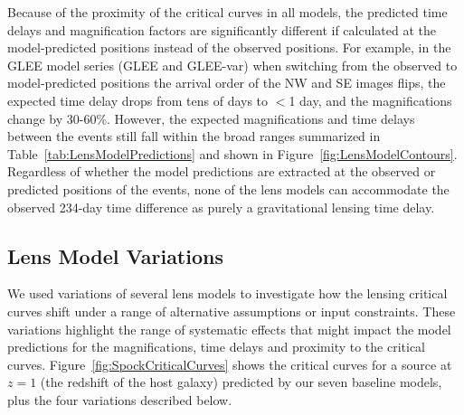
Because of the proximity of the critical curves in all models, the
predicted time delays and magnification factors are significantly
different if calculated at the model-predicted positions instead of
the observed positions.  For example, in the GLEE model series (GLEE
and GLEE-var) when switching from the observed to model-predicted
positions the arrival order of the NW and SE images flips, the
expected time delay drops from tens of days to $<$1 day, and the
magnifications change by 30-60\%.  However, the expected
magnifications and time delays between the events still fall within
the broad ranges summarized in Table~\ref{tab:LensModelPredictions}
and shown in Figure~\ref{fig:LensModelContours}.  Regardless of
whether the model predictions are extracted at the observed or
predicted positions of the \spock events, none of the lens models can
accommodate the observed 234-day time difference as purely a
gravitational lensing time delay.



\subsection{Lens Model Variations}\label{sec:LensModelVariations}

We used variations of several lens models to investigate how the
lensing critical curves shift under a range of alternative assumptions
or input constraints.  These variations highlight the range of
systematic effects that might impact the model predictions for the
\spock magnifications, time delays and proximity to the critical
curves.  Figure~\ref{fig:SpockCriticalCurves} shows the critical
curves for a source at $z=1$ (the redshift of the \spock host galaxy)
predicted by our seven baseline models, plus the four variations
described below.

